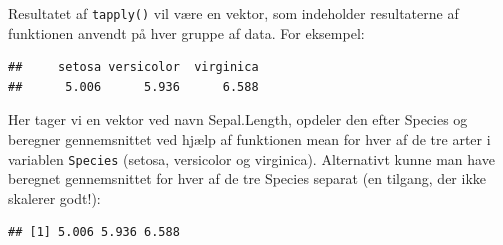 \documentclass[
]{book}
\newenvironment{Shaded}{\begin{snugshade}}{\end{snugshade}}
\newcommand{\CommentTok}[1]{\textcolor[rgb]{0.56,0.35,0.01}{\textit{#1}}}
\newcommand{\FunctionTok}[1]{\textcolor[rgb]{0.13,0.29,0.53}{\textbf{#1}}}
\newcommand{\NormalTok}[1]{#1}
\newcommand{\OtherTok}[1]{\textcolor[rgb]{0.56,0.35,0.01}{#1}}
\newcommand{\SpecialCharTok}[1]{\textcolor[rgb]{0.81,0.36,0.00}{\textbf{#1}}}
\newcommand{\StringTok}[1]{\textcolor[rgb]{0.31,0.60,0.02}{#1}}
\begin{document}
Resultatet af \texttt{tapply()} vil være en vektor, som indeholder resultaterne af funktionen anvendt på hver gruppe af data. For eksempel:

\begin{Shaded}
\end{Shaded}

\begin{verbatim}
##     setosa versicolor  virginica 
##      5.006      5.936      6.588
\end{verbatim}

Her tager vi en vektor ved navn Sepal.Length, opdeler den efter Species og beregner gennemsnittet ved hjælp af funktionen mean for hver af de tre arter i variablen \texttt{Species} (setosa, versicolor og virginica). Alternativt kunne man have beregnet gennemsnittet for hver af de tre Species separat (en tilgang, der ikke skalerer godt!):

\begin{Shaded}
\end{Shaded}

\begin{verbatim}
## [1] 5.006 5.936 6.588
\end{verbatim}
\end{document}
